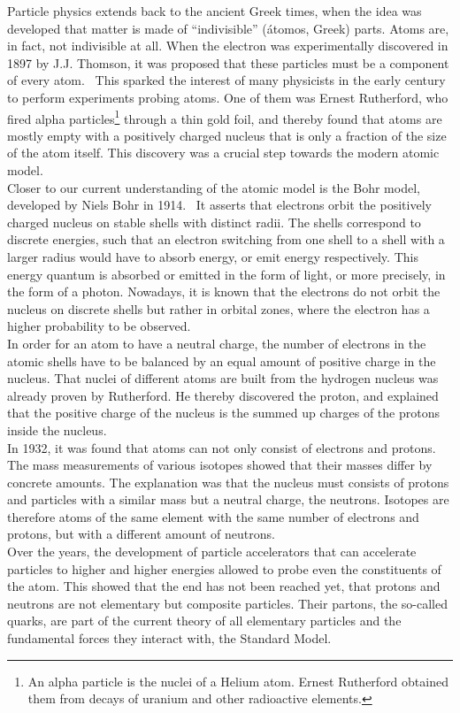 Particle physics extends back to the ancient Greek times, when the idea was developed that matter is made of ``indivisible'' (\'atomos, Greek) parts.
Atoms are, in fact, not indivisible at all.
When the electron was experimentally discovered in 1897 by J.J. Thomson, it was proposed that these particles must be a component of every atom.~\cite[p. 13ff]{Griffiths}
This sparked the interest of many physicists in the early  century to perform experiments probing atoms.
One of them was Ernest Rutherford, who fired alpha particles\footnote{An alpha particle is the nuclei of a Helium atom. Ernest Rutherford obtained them from decays of uranium and other radioactive elements.} through a thin gold foil, and thereby found that atoms are mostly empty with a positively charged nucleus that is only a fraction of the size of the atom itself.
This discovery was a crucial step towards the modern atomic model.\\
Closer to our current understanding of the atomic model is the Bohr model, developed by Niels Bohr in 1914.~\cite[p. 15]{Griffiths}
It asserts that electrons orbit the positively charged nucleus on stable shells with distinct radii.
The shells correspond to discrete energies, such that an electron switching from one shell to a shell with a larger radius would have to absorb energy, or emit energy respectively.
This energy quantum is absorbed or emitted in the form of light, or more precisely, in the form of a photon.
Nowadays, it is known that the electrons do not orbit the nucleus on discrete shells but rather in orbital zones, where the electron has a higher probability to be observed.\\
In order for an atom to have a neutral charge, the number of electrons in the atomic shells have to be balanced by an equal amount of positive charge in the nucleus.
That nuclei of different atoms are built from the hydrogen nucleus was already proven by Rutherford.
He thereby discovered the proton, and explained that the positive charge of the nucleus is the summed up charges of the protons inside the nucleus.\\
In 1932, it was found that atoms can not only consist of electrons and protons.~\cite[p. 15]{Griffiths}
The mass measurements of various isotopes showed that their masses differ by concrete amounts.
The explanation was that the nucleus must consists of protons and particles with a similar mass but a neutral charge, the neutrons.
Isotopes are therefore atoms of the same element with the same number of electrons and protons, but with a different amount of neutrons.\\
Over the years, the development of particle accelerators that can accelerate particles to higher and higher energies allowed to probe even the constituents of the atom.
This showed that the end has not been reached yet, that protons and neutrons are not elementary but composite particles.
Their partons, the so-called quarks, are part of the current theory of all elementary particles and the fundamental forces they interact with, the Standard Model.
